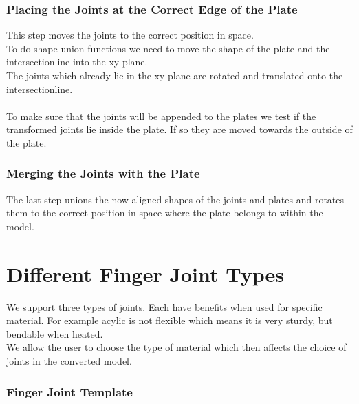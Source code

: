 \documentclass[../ClassicThesis.tex]{subfiles}
\begin{document}
\subsubsection*{Placing the Joints at the Correct Edge of the Plate}
This step moves the joints to the correct position in space. 
\*\\
To do shape union functions we need to move the shape of the plate and the intersectionline into the xy-plane.
\*\\
The joints which already lie in the xy-plane are rotated and translated onto the intersectionline.\\
\*\\
To make sure that the joints will be appended to the plates we test if the transformed joints lie inside the plate. If so they are moved towards the outside of the plate.
            
\subsubsection*{Merging the Joints with the Plate}
The last step unions the now aligned shapes of the joints and plates and rotates them to the correct position in space where the plate belongs to within the model.


\section{Different Finger Joint Types}
We support three types of joints. Each have benefits when used for specific material. For example acylic is not flexible which means it is very sturdy, but bendable when heated. \\
We allow the user to choose the type of material which then affects the choice of joints in the converted model.

\subsubsection{Finger Joint Template}
\end{document}
